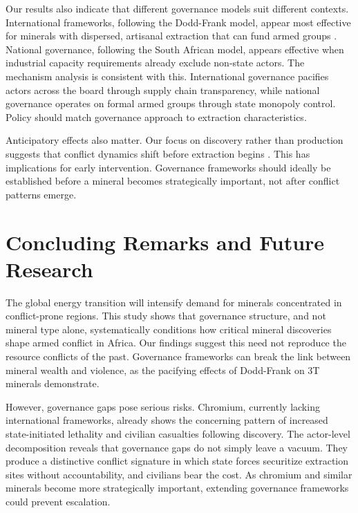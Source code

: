\documentclass[11pt]{article}
\begin{document}
Our results also indicate that different governance models suit different contexts. International frameworks, following the Dodd-Frank model, appear most effective for minerals with dispersed, artisanal extraction that can fund armed groups \citep{radley2021artisanal}. National governance, following the South African model, appears effective when industrial capacity requirements already exclude non-state actors. The mechanism analysis is consistent with this. International governance pacifies actors across the board through supply chain transparency, while national governance operates on formal armed groups through state monopoly control. Policy should match governance approach to extraction characteristics.

Anticipatory effects also matter. Our focus on discovery rather than production suggests that conflict dynamics shift before extraction begins \citep{cotet2013oil, arezki2017natural}. This has implications for early intervention. Governance frameworks should ideally be established before a mineral becomes strategically important, not after conflict patterns emerge.

\section{Concluding Remarks and Future Research}
\label{sec:conclusion}

The global energy transition will intensify demand for minerals concentrated in conflict-prone regions. This study shows that governance structure, and not mineral type alone, systematically conditions how critical mineral discoveries shape armed conflict in Africa. Our findings suggest this need not reproduce the resource conflicts of the past. Governance frameworks can break the link between mineral wealth and violence, as the pacifying effects of Dodd-Frank on 3T minerals demonstrate.

However, governance gaps pose serious risks. Chromium, currently lacking international frameworks, already shows the concerning pattern of increased state-initiated lethality and civilian casualties following discovery. The actor-level decomposition reveals that governance gaps do not simply leave a vacuum. They produce a distinctive conflict signature in which state forces securitize extraction sites without accountability, and civilians bear the cost. As chromium and similar minerals become more strategically important, extending governance frameworks could prevent escalation.
\end{document}

